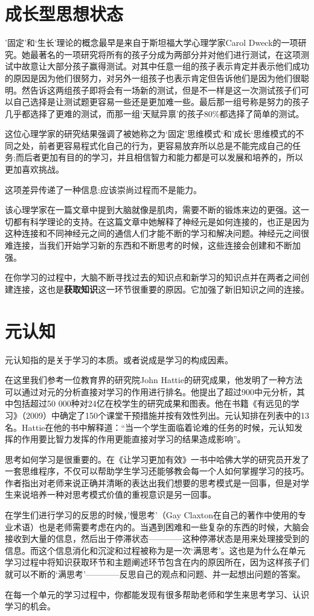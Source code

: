 \section{成长型思想状态}
    '固定'和‘生长’理论的概念最早是来自于斯坦福大学心理学家Carol Dweck的一项研究。她最著名的一项研究将所有的孩子分成为两部分并对他们进行测试，在这项测试中故意让大部分孩子赢得测试。对其中任意一组的孩子表示肯定并表示他们成功的原因是因为他们很努力，对另外一组孩子也表示肯定但告诉他们是因为他们很聪明。然告诉这两组孩子即将会有一场新的测试，但是不一样是这一次测试孩子们可以自己选择是让测试题更容易一些还是更加难一些。最后那一组号称是努力的孩子几乎都选择了更难的测试，而那一组‘天赋异禀’的孩子80\%都选择了简单的测试。\par
    这位心理学家的研究结果强调了被她称之为‘固定’思维模式‘和’成长‘思维模式的不同之处，前者更容易程式化自己的行为，更容易放弃所以总是不能完成自己的任务;而后者更加有目的的学习，并且相信智力和能力都是可以发展和培养的，所以更加喜欢挑战。\par
    这项差异传递了一种信息:应该崇尚过程而不是能力。\par
    该心理学家在一篇文章中提到大脑就像是肌肉，需要不断的锻炼来边的更强。这一切都有科学理论的支持。在这篇文章中她解释了神经元是如何连接的，也正是因为这种连接和不同神经元之间的通信人们才能不断的学习和解决问题。神经元之间很难连接，当我们开始学习新的东西和不断思考的时候，这些连接会创建和不断加强。\par
    在你学习的过程中，大脑不断寻找过去的知识点和新学习的知识点并在两者之间创建连接，这也是\textbf{获取知识}这一环节很重要的原因。它加强了新旧知识之间的连接。   \par

\section{元认知}
    元认知指的是关于学习的本质。或者说成是学习的构成因素。\par
    在这里我们参考一位教育界的研究院John Hattie的研究成果，他发明了一种方法可以通过对元的分析直接对学习的作用进行排名。他提出了超过900中元分析，其中包括超过50 000种对24亿在校学生的研究成果和图表。他在书籍《有远见的学习》（2009）中确定了150个课堂干预措施并按有效性列出。元认知排在列表中的13名。Hattie在他的书中解释道：“当一个学生面临着论难的任务的时候，元认知发挥的作用要比智力发挥的作用更能直接对学习的结果造成影响”。\par
    思考如何学习是很重要的。在《让学习更加有效》一书中哈佛大学的研究员开发了一套思维程序，不仅可以帮助学生学习还能够教会每一个人如何掌握学习的技巧。作者指出对老师来说正确并清晰的表达出我们想要的思考模式是一回事，但是对学生来说培养一种对思考模式价值的重视意识是另一回事。\par
    在学生们进行学习的反思的时候，'慢思考'（Gay Claxton在自己的著作中使用的专业术语）也是老师需要考虑在内的。当遇到困难和一些复杂的东西的时候，大脑会接收到大量的信息，然后出于停滞状态————这种停滞状态是用来处理接受到的信息。而这个信息消化和沉淀和过程被称为是一次‘满思考’。这也是为什么在单元学习过程中将知识获取环节和主题阐述环节包含在内的原因所在，因为这样孩子们就可以不断的‘满思考’————反思自己的观点和问题、并一起想出问题的答案。\par
    在每一个单元的学习过程中，你都能发现有很多帮助老师和学生来思考学习、认识学习的机会。

